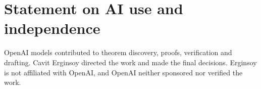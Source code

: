\documentclass[11pt]{amsart}
\begin{document}
\section*{Statement on AI use and independence}

OpenAI models contributed to theorem discovery, proofs, verification and
drafting.  Cavit Erginsoy directed the work and made the final decisions.  Erginsoy is not affiliated with OpenAI, and OpenAI
neither sponsored nor verified the work.

{


}
\end{document}
